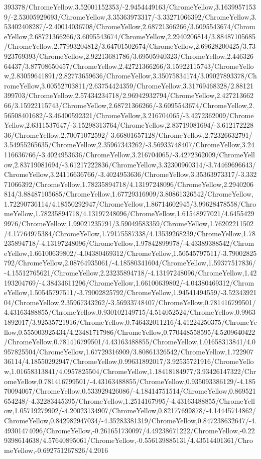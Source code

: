 {\begin{tikzternal}
393378/ChromeYellow,3.52001152353/-2.9454449163/ChromeYellow,3.16399571539/-2.53005929693/ChromeYellow,3.35363973317/-3.33271066392/ChromeYellow,3.53402408287/-2.40014036708/ChromeYellow,2.68721366266/3.6095543674/ChromeYellow,2.68721366266/3.6095543674/ChromeYellow,2.2940206814/3.88487105685/ChromeYellow,2.77993204812/3.64701502674/ChromeYellow,2.69628200425/3.73923769393/ChromeYellow,2.92213681786/3.69505940323/ChromeYellow,2.44632664437/3.87708650457/ChromeYellow,2.42721366266/3.15922115743/ChromeYellow,2.83059641891/2.82773659636/ChromeYellow,3.35075834174/3.09027893378/ChromeYellow,3.00552703811/2.63754424359/ChromeYellow,3.31769468328/2.88121399703/ChromeYellow,2.57434234718/2.96942932794/ChromeYellow,2.42721366266/3.15922115743/ChromeYellow,2.68721366266/-3.6095543674/ChromeYellow,2.56508401682/-3.46400592321/ChromeYellow,3.216704065/-3.4272362009/ChromeYellow,2.6311537647/-3.15298313764/ChromeYellow,2.83719081694/-3.61217222836/ChromeYellow,2.70071072592/-3.66801657128/ChromeYellow,2.72326632791/-3.54955265635/ChromeYellow,2.35967343262/-3.56933748407/ChromeYellow,3.24116636766/-3.4024953636/ChromeYellow,3.216704065/-3.4272362009/ChromeYellow,2.83719081694/-3.61217222836/ChromeYellow,3.32300960314/-3.74469696643/ChromeYellow,3.24116636766/-3.4024953636/ChromeYellow,3.35363973317/-3.33271066392/ChromeYellow,1.78235894718/4.13197248096/ChromeYellow,2.2940206814/3.88487105685/ChromeYellow,1.67729316909/3.80861326542/ChromeYellow,1.72290736114/4.18550292947/ChromeYellow,1.86714602945/3.99628478558/ChromeYellow,1.78235894718/4.13197248096/ChromeYellow,1.61548977021/4.64554299976/ChromeYellow,1.99021235791/3.59049583359/ChromeYellow,1.76202211502/4.17764975384/ChromeYellow,1.79175587338/4.13539268239/ChromeYellow,1.78235894718/-4.13197248096/ChromeYellow,1.97842899978/-4.43389388542/ChromeYellow,1.66100639802/-4.04380469312/ChromeYellow,1.50545797511/-3.79002825792/ChromeYellow,2.08764935061/-4.18580341604/ChromeYellow,1.59377517836/-4.15512765621/ChromeYellow,2.23235894718/-4.13197248096/ChromeYellow,1.42193204769/-4.38434611296/ChromeYellow,1.66100639802/-4.04380469312/ChromeYellow,1.50545797511/-3.79002825792/ChromeYellow,1.94541494559/-3.5234392104/ChromeYellow,2.35967343262/-3.56933748407/ChromeYellow,0.781416799501/4.43163488855/ChromeYellow,0.930102149715/4.514052524/ChromeYellow,0.99631892017/3.92535721916/ChromeYellow,0.746432011216/4.41224250375/ChromeYellow,0.555003925434/4.23481717986/ChromeYellow,0.770448558595/4.5209640422/ChromeYellow,0.781416799501/4.43163488855/ChromeYellow,1.01658313841/4.0957825504/ChromeYellow,1.67729316909/3.80861326542/ChromeYellow,1.72290736114/4.18550292947/ChromeYellow,0.99631892017/3.92535721916/ChromeYellow,1.01658313841/4.0957825504/ChromeYellow,1.18418184977/3.93426147322/ChromeYellow,0.781416799501/-4.43163488855/ChromeYellow,0.935093386129/-4.18570094067/ChromeYellow,0.533929426086/-4.18414751514/ChromeYellow,0.869521654248/-4.32283445395/ChromeYellow,1.2514167995/-4.43163488855/ChromeYellow,1.05719279902/-4.20023134907/ChromeYellow,0.82177699878/-4.14445714862/ChromeYellow,0.842982947034/-4.35283381319/ChromeYellow,0.847238632647/-4.49301474096/ChromeYellow,-0.261651730097/4.49238671222/ChromeYellow,-0.229398614638/4.57640895061/ChromeYellow,-0.556139885131/4.43514401361/ChromeYellow,-0.692751267826/4.2016
\end{tikzternal}}
